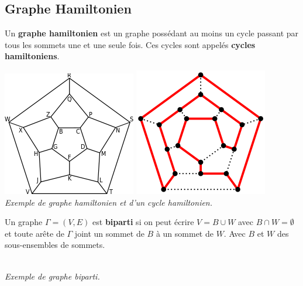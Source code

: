 \documentclass[11pt]{article}
\begin{document}
	\subsection{Graphe Hamiltonien}
		Un \textbf{graphe hamiltonien} est un graphe possédant au moins un cycle passant par tous les sommets une et une seule fois. Ces cycles sont appelés \textbf{cycles hamiltoniens}.
		\begin{center}
			\includegraphics[scale=0.6]{hamiltonien.png}
			\qquad
			\includegraphics[scale=0.57]{hamiltonien2.png}\\
			\textit{Exemple de graphe hamiltonien et d'un cycle hamiltonien.}
		\end{center}
		
		Un graphe $\Gamma = (V,E)$ est \textbf{biparti} si on peut écrire $V = B \cup W$ avec $B \cap W = \emptyset$ et toute arête de $\Gamma$ joint un sommet de $B$ à un sommet de $W$. Avec $B$ et $W$ des sous-ensembles de sommets.
		\begin{center}
			 \\
		\textit{Exemple de graphe biparti.}
		\end{center}
			
\end{document}
